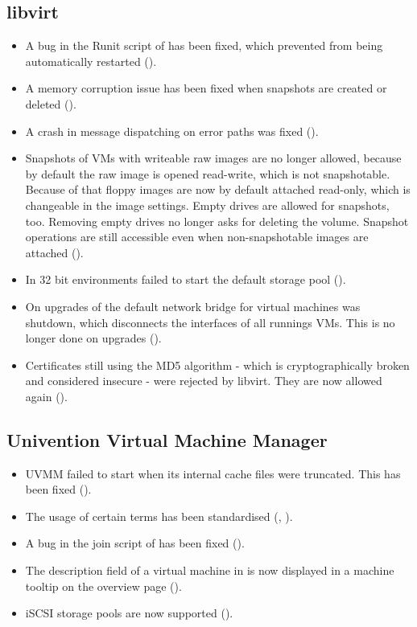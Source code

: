 \subsection{libvirt}
\begin{itemize}
\item A bug in the Runit script of  has
  been fixed, which prevented  from being
  automatically restarted ().
\item A memory corruption issue has been fixed when snapshots are
  created or deleted ().
\item A crash in message dispatching on error paths was fixed
  ().
\item Snapshots of VMs with writeable raw images are no longer
  allowed, because by default the raw image is opened read-write,
  which is not snapshotable. Because of that floppy images are now by
  default attached read-only, which is changeable in the image
  settings. Empty drives are allowed for snapshots, too. Removing
  empty drives no longer asks for deleting the volume. Snapshot
  operations are still accessible even when non-snapshotable images
  are attached ().
\item In 32 bit environments  failed to start the
  default storage pool ().
\item On upgrades of
   the default
  network bridge for virtual machines was shutdown, which disconnects
  the interfaces of all runnings VMs. This is no longer done on
  upgrades ().
\item Certificates still using the MD5 algorithm - which
  is cryptographically broken and considered insecure - were rejected
  by libvirt. They are now allowed again ().
\end{itemize}

\subsection{Univention Virtual Machine Manager}
\begin{itemize}
\item UVMM failed to start when its internal cache files were
  truncated. This has been fixed ().
\item The usage of certain terms has been standardised (, ).
\item A bug in the join script of
   has been fixed
  ().
\item The description field of a virtual machine in  is now displayed
  in a machine tooltip on the overview page ().
\item iSCSI storage pools are now supported ().
\end{itemize}

